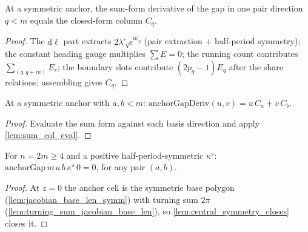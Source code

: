 \begin{lemma}
  \label{lem:sum_col_eval}
  At a symmetric anchor, the sum-form derivative of the gap in one pair
  direction $q < m$ equals the closed-form column $C_q$.
\end{lemma}
\begin{proof}

\leanok
  The $\mathrm{d}\ell$ part extracts $2\lambda'_q e^{\mathrm{i}\psi_q}$
  (pair extraction + half-period symmetry); the constant heading gauge
  multiplies $\sum E = 0$; the running count contributes
  $\sum_{(q,q+m)} E_r$; the boundary slots contribute $(2p_q-1)E_q$
  after the share relations; assembling gives $C_q$.
\end{proof}

\begin{lemma}
  \label{lem:anchor_gap_deriv_eq}
  At a symmetric anchor with $a, b < m$:
  $\mathrm{anchorGapDeriv}(u,v) = u\,C_a + v\,C_b$.
\end{lemma}
\begin{proof}

\leanok
  Evaluate the sum form against each basis direction and apply
  \cref{lem:sum_col_eval}.
\end{proof}

\begin{lemma}
  \label{lem:anchor_gap_center_eq_zero}
  For $n = 2m \ge 4$ and a positive half-period-symmetric $\kappa^s$:
  $\mathrm{anchorGap}\,m\,a\,b\,\kappa^s\,0 = 0$, for any pair $(a,b)$.
\end{lemma}
\begin{proof}

\leanok
  At $z = 0$ the anchor cell is the symmetric base polygon
  (\cref{lem:jacobian_base_len_symm}) with turning sum $2\pi$
  (\cref{lem:turning_sum_jacobian_base_len}), so
  \cref{lem:central_symmetry_closes} closes it.
\end{proof}


